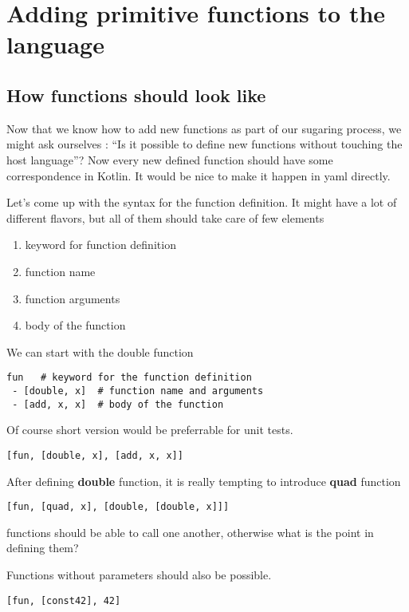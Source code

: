 \documentclass[11pt]{article}
\begin{document}
\section{Adding primitive functions to the language}
\label{sec:orgf7ee279}
\subsection{How functions should look like}
\label{sec:orgd72c5a5}
Now that we know how to add new functions as part of our sugaring process, we might ask ourselves :
``Is it possible to define new functions without touching the host language''?
Now every new defined function should have some correspondence in Kotlin.
It would be nice to make it happen in yaml directly.

Let's come up with the syntax for the function definition.
It might have a lot of different flavors, but all of them should take care of few elements
\begin{enumerate}
\item keyword for function definition
\item function name
\item function arguments
\item body of the function
\end{enumerate}

We can start with the double function
\begin{verbatim}
fun   # keyword for the function definition
 - [double, x]  # function name and arguments
 - [add, x, x]  # body of the function
\end{verbatim}

Of course short version would be preferrable for unit tests.
\begin{verbatim}
[fun, [double, x], [add, x, x]]
\end{verbatim}

After defining \textbf{double} function, it is really tempting to introduce \textbf{quad} function

\begin{verbatim}
[fun, [quad, x], [double, [double, x]]]
\end{verbatim}
functions should be able to call one another, otherwise what is the point in defining them?


Functions without parameters should also be possible.

\begin{verbatim}
[fun, [const42], 42]
\end{verbatim}
\end{document}
